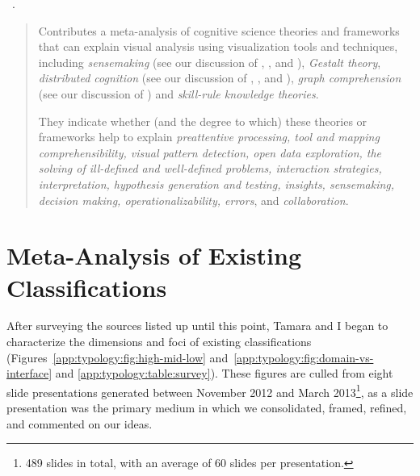 \begin{sloppypar}
~\cite{Pohl2012}. \end{sloppypar}

\begin{quotation}
    Contributes a meta-analysis of cognitive science theories and frameworks that can explain visual analysis using visualization tools and techniques, including {\it sensemaking} (see our discussion of \citet{Pirolli2005}, \citet{Pirolli2009}, and \citet{Klein2006}), {\it Gestalt theory}, {\it distributed cognition} (see our discussion of \citet{Hollan2000}, \citet{Liu2008}, and \citet{Kirsh1994}), {\it graph comprehension} (see our discussion of \citet{Friel2001}) and {\it skill-rule knowledge theories}. 
    
    They indicate whether (and the degree to which) these theories or frameworks help to explain {\it preattentive processing, tool and mapping comprehensibility, visual pattern detection, open data exploration, the solving of ill-defined and well-defined problems, interaction strategies, interpretation, hypothesis generation and testing, insights, sensemaking, decision making, operationalizability, errors}, and {\it collaboration}.
\end{quotation}


\section{Meta-Analysis of Existing Classifications}
\label{app:typology:meta-analysis}


After surveying the sources listed up until this point, Tamara and I began to characterize the dimensions and foci of existing classifications (Figures~\ref{app:typology:fig:high-mid-low} and~\ref{app:typology:fig:domain-vs-interface} and \autoref{app:typology:table:survey}).
These figures are culled from eight slide presentations generated between November 2012 and March 2013\footnote{489 slides in total, with an average of 60 slides per presentation.}, as a slide presentation was the primary medium in which we consolidated, framed, refined, and commented on our ideas. 

